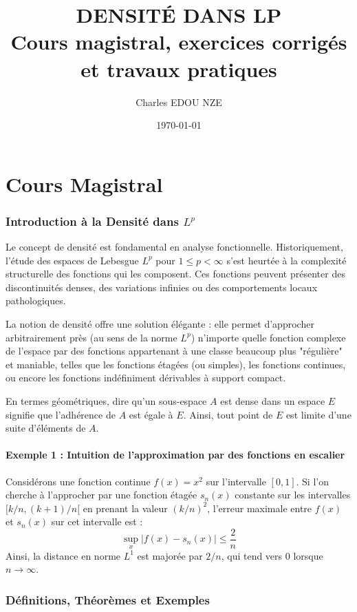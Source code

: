 \documentclass[11pt,a4paper]{article}
\title{\Huge DENSITÉ DANS LP \\ \large Cours magistral, exercices corrigés et travaux pratiques}
\author{\Large Charles EDOU NZE}
\date{\today}
\begin{document}
\maketitle
\tableofcontents
\newpage

\part{Cours Magistral}


\section{Introduction à la Densité dans $L^p$}

Le concept de densité est fondamental en analyse fonctionnelle. Historiquement, l'étude des espaces de Lebesgue $L^p$ pour $1 \le p < \infty$ s'est heurtée à la complexité structurelle des fonctions qui les composent. Ces fonctions peuvent présenter des discontinuités denses, des variations infinies ou des comportements locaux pathologiques.

La notion de densité offre une solution élégante : elle permet d'approcher arbitrairement près (au sens de la norme $L^p$) n'importe quelle fonction complexe de l'espace par des fonctions appartenant à une classe beaucoup plus "régulière" et maniable, telles que les fonctions étagées (ou simples), les fonctions continues, ou encore les fonctions indéfiniment dérivables à support compact.

En termes géométriques, dire qu'un sous-espace $A$ est dense dans un espace $E$ signifie que l'adhérence de $A$ est égale à $E$. Ainsi, tout point de $E$ est limite d'une suite d'éléments de $A$.

\subsection{Exemple 1 : Intuition de l'approximation par des fonctions en escalier}
Considérons une fonction continue $f(x) = x^2$ sur l'intervalle $[0,1]$.
Si l'on cherche à l'approcher par une fonction étagée $s_n(x)$ constante sur les intervalles $[k/n, (k+1)/n[$ en prenant la valeur $(k/n)^2$, l'erreur maximale entre $f(x)$ et $s_n(x)$ sur cet intervalle est :
$$ \sup_{x} |f(x) - s_n(x)| \le \frac{2}{n} $$
Ainsi, la distance en norme $L^1$ est majorée par $2/n$, qui tend vers $0$ lorsque $n \to \infty$.

\section{Définitions, Théorèmes et Exemples}
\end{document}
